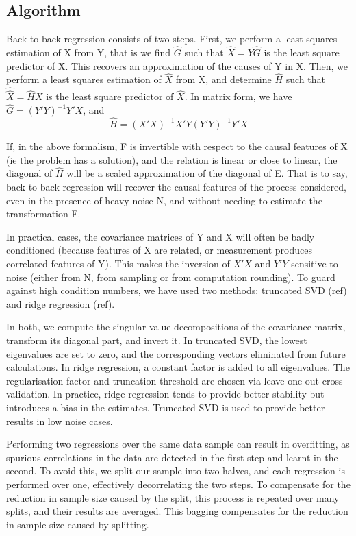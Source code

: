 \documentclass{article}
\begin{document}
\subsection{Algorithm}

Back-to-back regression consists of two steps.
%
First, we perform a least squares estimation of X from Y, that is we find $\hat G$ such that $\hat X=Y\hat G$ is the least square predictor of X.
%
This recovers an approximation of the causes of Y in X.
%
Then, we perform a least squares estimation of $\hat X$ from X, and determine $\hat H$ such that $\hat {\hat X}=\hat H X$ is the least square predictor of $\hat X$.
%
In matrix form, we have $\hat G=(Y'Y)^{-1} Y'X$, and
\begin{equation} \hat H=(X'X)^{-1} X'Y(Y'Y)^{-1} Y'X\end{equation}

If, in the above formalism, F is invertible with respect to the causal features of X (ie the problem has a solution), and the relation is linear or close to linear, the diagonal of $\hat H$ will be a scaled approximation of the diagonal of E. That is to say, back to back regression will recover the causal features of the process considered, even in the presence of heavy noise N, and without needing to estimate the transformation F.
 
In practical cases, the covariance matrices of Y and X will often be badly conditioned (because features of X are related, or measurement produces correlated features of Y). This makes the inversion of $X'X$ and $Y'Y$ sensitive to noise (either from N, from sampling or from computation rounding). To guard against high condition numbers, we have used two methods: truncated SVD (ref) and ridge regression (ref). 

In both, we compute the singular value decompositions of the covariance matrix, transform its diagonal part, and invert it. In truncated SVD, the lowest eigenvalues are set to zero, and the corresponding vectors eliminated from future calculations. In ridge regression, a constant factor is added to all eigenvalues. The regularisation factor and truncation threshold are chosen via leave one out cross validation. In practice, ridge regression tends to provide better stability but introduces a bias in the estimates. Truncated SVD is used to provide better results in low noise cases.

Performing two regressions over the same data sample can result in overfitting, as spurious correlations in the data are detected in the first step and learnt in the second. To avoid this, we split our sample into two halves, and each regression is performed over one, effectively decorrelating the two steps.
%
To compensate for the reduction in sample size caused by the split, this process is repeated over many splits, and their results are averaged.
This bagging compensates for the reduction in sample size caused by splitting.
\end{document}
